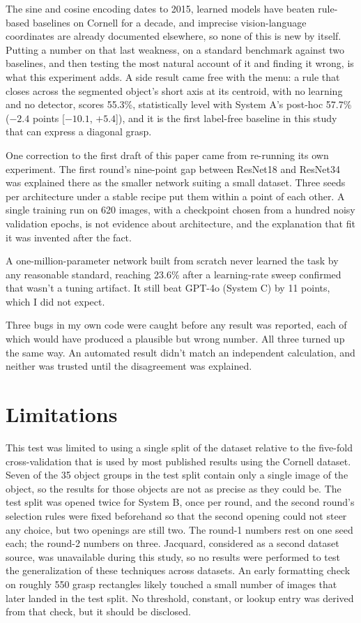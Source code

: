 \documentclass[12pt,letterpaper]{article}
\begin{document}
The sine and cosine encoding dates to 2015, learned models have beaten
rule-based baselines on Cornell for a decade, and imprecise
vision-language coordinates are already documented elsewhere, so none
of this is new by itself. Putting a number on that last weakness, on a
standard benchmark against two baselines, and then testing the most
natural account of it and finding it wrong, is what this experiment
adds. A side result came free with the menu: a rule that closes across
the segmented object's short axis at its centroid, with no learning and
no detector, scores 55.3\%, statistically level with System A's
post-hoc 57.7\% ($-2.4$ points [$-10.1$, $+5.4$]), and it is the first
label-free baseline in this study that can express a diagonal grasp.

One correction to the first draft of this paper came from re-running
its own experiment. The first round's nine-point gap between ResNet18
and ResNet34 was explained there as the smaller network suiting a small
dataset. Three seeds per architecture under a stable recipe put them
within a point of each other. A single training run on 620 images, with
a checkpoint chosen from a hundred noisy validation epochs, is not
evidence about architecture, and the explanation that fit it was
invented after the fact.

A one-million-parameter network built from scratch never learned the
task by any reasonable standard, reaching 23.6\% after a learning-rate
sweep confirmed that wasn't a tuning artifact. It still beat GPT-4o
(System C) by 11 points, which I did not expect.

Three bugs in my own code were caught before any result was reported,
each of which would have produced a plausible but wrong number. All
three turned up the same way. An automated result didn't match an
independent calculation, and neither was trusted until the disagreement
was explained.

\section{Limitations}

This test was limited to using a single split of the dataset relative
to the five-fold cross-validation that is used by most published
results using the Cornell dataset. Seven of the 35 object groups in the
test split contain only a single image of the object, so the results for
those objects are not as precise as they could be. The test split was
opened twice for System B, once per round, and the second round's
selection rules were fixed beforehand so that the second opening could
not steer any choice, but two openings are still two. The round-1
numbers rest on one seed each; the round-2 numbers on three. Jacquard, considered
as a second dataset source, was unavailable during this study, so no
results were performed to test the generalization of these techniques
across datasets. An early formatting check on roughly 550 grasp
rectangles likely touched a small number of images that later landed in
the test split. No threshold, constant, or lookup entry was derived
from that check, but it should be disclosed.
\end{document}

